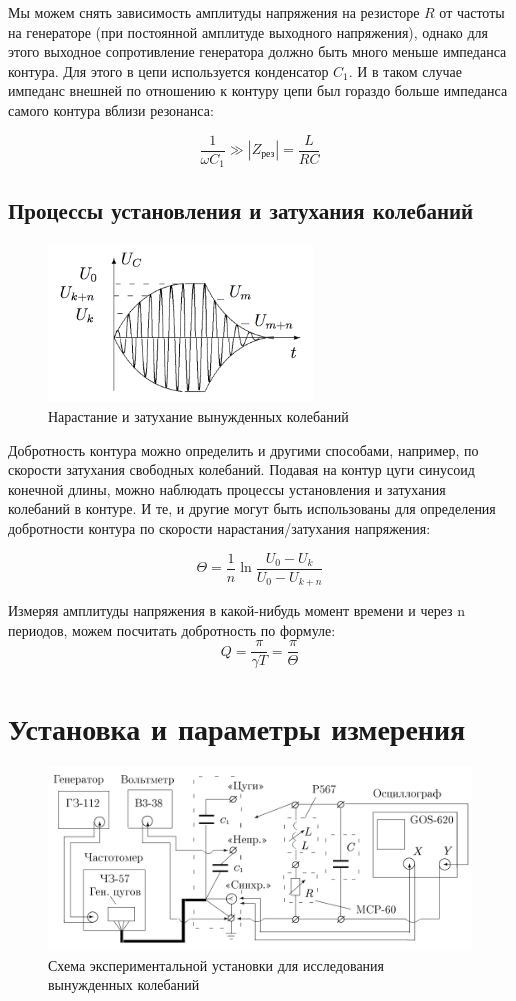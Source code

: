 \documentclass{letnab}
\begin{document}
Мы можем снять зависимость амплитуды напряжения на резисторе $R$ от частоты на генераторе (при постоянной амплитуде выходного напряжения), однако для этого выходное сопротивление генератора должно быть много меньше импеданса контура. Для этого в цепи используется конденсатор $C_1$. И в таком случае импеданс внешней по отношению к контуру цепи был гораздо больше импеданса самого контура вблизи резонанса:

$$\dfrac{1}{\omega C_1} \gg |Z_\text{рез}| = \dfrac{L}{RC} $$

\subsection{Процессы установления и затухания колебаний}

\begin{figure}
\includegraphics[width=7cm]{Scheme3}
\caption{Нарастание и затухание вынужденных колебаний}
\end{figure} 

Добротность контура можно определить и другими способами, например, по скорости затухания свободных колебаний. Подавая на контур цуги синусоид конечной длины, можно наблюдать процессы установления и затухания колебаний в контуре. И те, и другие могут быть использованы для определения добротности контура по скорости нарастания/затухания напряжения:

$$\Theta = \dfrac{1}{n} \ln \dfrac{U_0 - U_k}{U_0-U_{k+n}} $$


Измеряя амплитуды напряжения в какой-нибудь момент времени и через n периодов, можем посчитать добротность по формуле:
$$Q = \dfrac{\pi}{\gamma 	T} = \dfrac{\pi}{\Theta}$$
\section{Установка и параметры измерения}

\begin{figure}[H]
\includegraphics[width = 0.9 \tw]{Scheme}
\caption{Схема экспериментальной установки для исследования вынужденных колебаний}
\end{figure}
\end{document}
